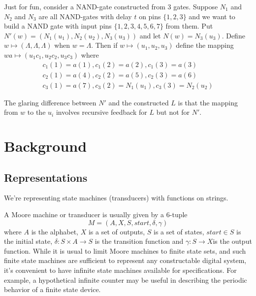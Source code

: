 \documentclass[runningheads,letter]{llncs}
\newcommand{\set}[1]{\{#1\}}
\newcommand{\ess}{\Lambda}
\newcommand{\st}{\mathit{start}}
\begin{document}
Just for fun, consider a NAND-gate constructed from 3 gates. Suppose $N_1$ and 
$N_2$ and $N_3$ are all NAND-gates with delay $t$ on pins $\set{1,2,3}$ and 
we want to build a NAND gate with input pins $\set{1,2,3,4,5,6,7}$ from them.
Put $N'(w) =  (N_1(u_1), N_2(u_2), N_3(u_3))$ and let $N(w)= N_3(u_3)$. 
Define $w\mapsto (\ess,\ess,\ess)$ when $w=\ess$. Then if
$w\mapsto (u_1,u_2,u_3)$ define the mapping $wa\mapsto (u_1c_1,u_2c_2,u_3c_3)$
where 
\begin{eqnarray}
c_1(1)=a(1), c_1(2)=a(2), c_1(3)=a(3)\\
c_2(1)=a(4), c_2(2)=a(5), c_2(3)=a(6)\\
c_3(1)=a(7), c_3(2)= N_1(u_1), c_3(3)= N_2(u_2)\end{eqnarray}

The glaring difference between $N'$ and the constructed $L$ is that the
mapping from $w$ to the $u_i$ involves recursive feedback for $L$ but not
for $N'$.

\section{Background\label{sec:back}}

\subsection{Representations}
We're representing state machines (transducers) with functions on strings.
\begin{center}
\end{center}

A Moore machine or transducer is usually given by a 6-tuple
\[M=(A,X, S,\st,\delta,\gamma)\]
where $A$ is the alphabet, $X$ is a set of outputs, $S$ is a set of states, $\st\in S$ is the initial
state, $\delta: S\times A\to S$ is the transition function
and $\gamma:S\to X$is the output function.
While it is usual to limit Moore machines to finite state sets, and such
finite state machines are sufficient to represent any constructable digital
system, it's convenient to have infinite state machines available for specifications. For example, a hypothetical infinite counter may be useful in describing the periodic
behavior of a finite state device. 
\end{document}

